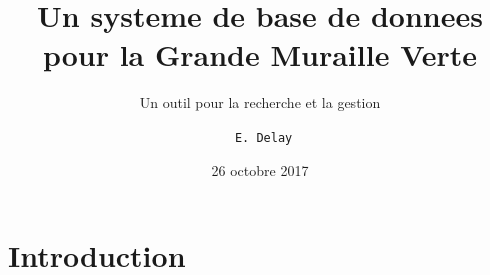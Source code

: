 \documentclass[newPxFont]{beamer}
\title{Un systeme de base de donnees pour la Grande Muraille Verte}
\subtitle{Un outil pour la recherche et la gestion}
\date{26 octobre 2017}
\author{\texttt{ E. Delay}}
\institute{\textsc{Ohm} Téssékéré - Sénégal}
\begin{document}
%
%

\maketitle


%
%


\section{Introduction}
\end{document}
